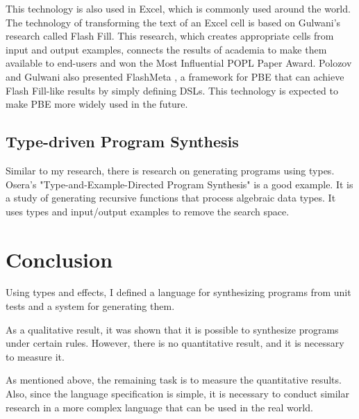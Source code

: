 \documentclass[12pt, a4paper, titlepage]{report}
\begin{document}
    This technology is also used in Excel, which is commonly used around the world.
    The technology of transforming the text of an Excel cell is based on Gulwani's research called Flash Fill\cite{gulwani:2011}.
    This research, which creates appropriate cells from input and output examples, connects the results of academia to make them available to end-users and won the Most Influential POPL Paper Award.
    Polozov and Gulwani also presented FlashMeta \cite{polozov:2015}, a framework for PBE that can achieve Flash Fill-like results by simply defining DSLs.
    This technology is expected to make PBE more widely used in the future.

  \section{Type-driven Program Synthesis}
    Similar to my research, there is research on generating programs using types.
    Osera's "Type-and-Example-Directed Program Synthesis"\cite{osera:2015} is a good example.
    It is a study of generating recursive functions that process algebraic data types.
    It uses types and input/output examples to remove the search space.

\chapter{Conclusion}\label{chapter:conclusion}
Using types and effects, I defined a language for synthesizing programs from unit tests and a system for generating them.

As a qualitative result, it was shown that it is possible to synthesize programs under certain rules.
However, there is no quantitative result, and it is necessary to measure it.

As mentioned above, the remaining task is to measure the quantitative results. Also, since the language specification is simple, it is necessary to conduct similar research in a more complex language that can be used in the real world.



\end{document}
